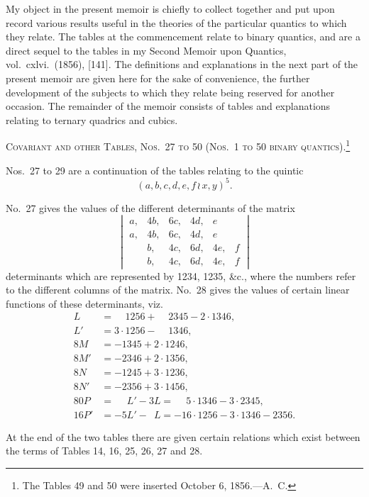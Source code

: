 \documentclass[11pt,a4paper]{book}
\begin{document}
\begin{center}
My object in the present memoir is chiefly to collect together and put upon
record various results useful in the theories of the particular quantics to which
they relate. The tables at the commencement relate to binary quantics, and are a
direct sequel to the tables in my Second Memoir upon Quantics, vol.~cxlvi.~(1856), [141].
The definitions and explanations in the next part of the present memoir are given
here for the sake of convenience, the further development of the subjects to which
they relate being reserved for another occasion. The remainder of the memoir consists
of tables and explanations relating to ternary quadrics and cubics.

\bigskip
\noindent\textsc{Covariant and other Tables, Nos.~27 to 50 (Nos.~1 to 50 binary quantics).}\footnote{The Tables 49 and 50 were inserted October 6, 1856.---A.~C.}

Nos.~27 to 29 are a continuation of the tables relating to the quintic
\[(a, b, c, d, e, f \, \wr\, x, y)^5.\]

No.~27 gives the values of the different determinants of the matrix
\[
\begin{vmatrix}
a, & 4b, & 6c, & 4d, & e \\
a, & 4b, & 6c, & 4d, & e \\
  & b, & 4c, & 6d, & 4e, & f \\
  & b, & 4c, & 6d, & 4e, & f
\end{vmatrix}
\]
determinants which are represented by 1234, 1235, \&c., where the numbers refer to
the different columns of the matrix. No.~28 gives the values of certain linear
functions of these determinants, viz.
\begin{align*}
L &= \phantom{3\cdot}1256 + \phantom{2\cdot}2345 - 2\cdot 1346,\\
L' &= 3\cdot 1256 - \phantom{3\cdot}1346,\\
8M &= -1345 + 2\cdot 1246,\\
8M' &= -2346 + 2\cdot 1356,\\
8N &= -1245 + 3\cdot 1236,\\
8N' &= -2356 + 3\cdot 1456,\\
80P &= \phantom{-5}L' - 3L = \phantom{-}5\cdot 1346 - 3\cdot 2345,\\
16P' &= -5L' - \phantom{3}L = -16\cdot 1256 - 3\cdot 1346 - 2356.
\end{align*}

At the end of the two tables there are given certain relations which exist between
the terms of Tables 14, 16, 25, 26, 27 and 28.


\end{center}
\end{document}
